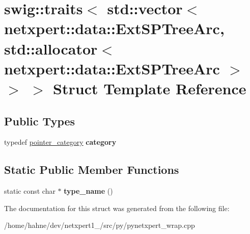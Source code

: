 \hypertarget{structswig_1_1traits_3_01std_1_1vector_3_01netxpert_1_1data_1_1ExtSPTreeArc_00_01std_1_1allocato110cadc24a7a53713c255f158da68b97}{}\section{swig\+:\+:traits$<$ std\+:\+:vector$<$ netxpert\+:\+:data\+:\+:Ext\+S\+P\+Tree\+Arc, std\+:\+:allocator$<$ netxpert\+:\+:data\+:\+:Ext\+S\+P\+Tree\+Arc $>$ $>$ $>$ Struct Template Reference}
\label{structswig_1_1traits_3_01std_1_1vector_3_01netxpert_1_1data_1_1ExtSPTreeArc_00_01std_1_1allocato110cadc24a7a53713c255f158da68b97}
\subsection*{Public Types}
\begin{DoxyCompactItemize}
\item 
typedef \hyperlink{structswig_1_1pointer__category}{pointer\+\_\+category} {\bfseries category}\hypertarget{structswig_1_1traits_3_01std_1_1vector_3_01netxpert_1_1data_1_1ExtSPTreeArc_00_01std_1_1allocato110cadc24a7a53713c255f158da68b97_a9f3d6892dd68088e9733a86203f9938f}{}\label{structswig_1_1traits_3_01std_1_1vector_3_01netxpert_1_1data_1_1ExtSPTreeArc_00_01std_1_1allocato110cadc24a7a53713c255f158da68b97_a9f3d6892dd68088e9733a86203f9938f}

\end{DoxyCompactItemize}
\subsection*{Static Public Member Functions}
\begin{DoxyCompactItemize}
\item 
static const char $\ast$ {\bfseries type\+\_\+name} ()\hypertarget{structswig_1_1traits_3_01std_1_1vector_3_01netxpert_1_1data_1_1ExtSPTreeArc_00_01std_1_1allocato110cadc24a7a53713c255f158da68b97_a1aa1bb35b248f126b8319d0079477009}{}\label{structswig_1_1traits_3_01std_1_1vector_3_01netxpert_1_1data_1_1ExtSPTreeArc_00_01std_1_1allocato110cadc24a7a53713c255f158da68b97_a1aa1bb35b248f126b8319d0079477009}

\end{DoxyCompactItemize}


The documentation for this struct was generated from the following file\+:\begin{DoxyCompactItemize}
\item 
/home/hahne/dev/netxpert1\+\_/src/py/pynetxpert\+\_\+wrap.\+cpp\end{DoxyCompactItemize}
